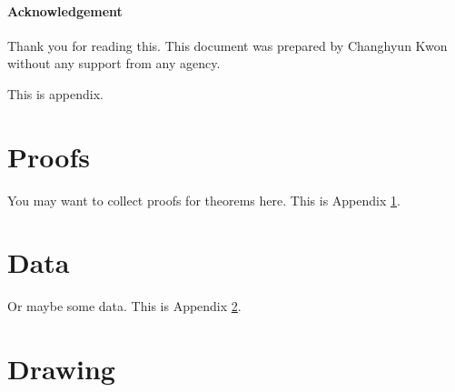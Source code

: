 \documentclass[letterpaper, 11pt]{article}
\begin{document}
\paragraph{Acknowledgement}
Thank you for reading this.
This document was prepared by Changhyun Kwon without any support from any agency.











\newpage
\renewcommand{\appendixpagename}{Appendix}

\appendix
\appendixpage

This is appendix.

\section{Proofs} \label{appendix:proofs}

You may want to collect proofs for theorems here.
This is Appendix \ref{appendix:proofs}.

\section{Data} \label{appendix:data}

Or maybe some data. This is Appendix \ref{appendix:data}.

\section{Drawing} \label{appendix:drawing}
\end{document}
